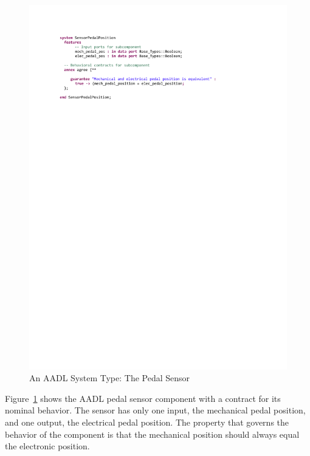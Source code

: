 \begin{figure}[h!]
	\hspace*{-2cm}
	\vspace{-0.4in} 
	\begin{center}
		\includegraphics[trim=0 640 -10 70,clip,width=1.5\dimexpr\textwidth-2cm\relax]{images/system_sensor.pdf}
		\caption{An AADL System Type: The Pedal Sensor}
		\label{fig:sensor}
	\end{center}
	\vspace{-0.3in}
\end{figure}

Figure~\ref{fig:sensor} shows the AADL pedal sensor component with a contract for its nominal behavior. The sensor has only one input, the mechanical pedal position, and one output, the electrical pedal position. The property that governs the behavior of the component is that the mechanical position should always equal the electronic position. 

